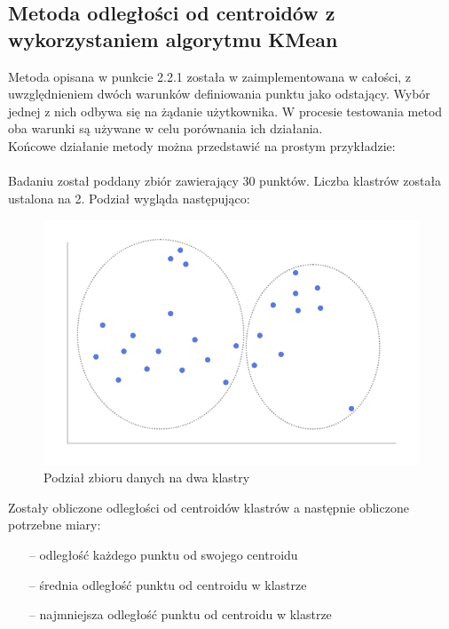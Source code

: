 \documentclass[eng,printmode]{mgr}
\begin{document}
\subsection{Metoda odległości od centroidów z wykorzystaniem algorytmu KMean}
Metoda opisana w punkcie 2.2.1 została w zaimplementowana w całości, z uwzględnieniem dwóch warunków definiowania punktu jako odstający. Wybór jednej z nich odbywa się na żądanie użytkownika. W procesie testowania metod oba warunki są używane w celu porównania ich działania.\\
Końcowe działanie metody można przedstawić na prostym przykładzie:
\\\\
Badaniu został poddany zbiór zawierający 30 punktów. Liczba klastrów została ustalona na 2. Podział wygląda następująco:
\begin{figure}[H]
  \begin{center}
    \includegraphics[scale=0.5]{kmean_dist}
        \caption{Podział zbioru danych na dwa klastry}
  \end{center}
\end{figure}
Zostały obliczone odległości od centroidów klastrów a następnie obliczone potrzebne miary:
\begin{itemize}
  \item[--] odległość każdego punktu od swojego centroidu
  \item[--] średnia odległość punktu od centroidu w klastrze
  \item[--] najmniejsza odległość punktu od centroidu w klastrze
\end{itemize}
\end{document}
